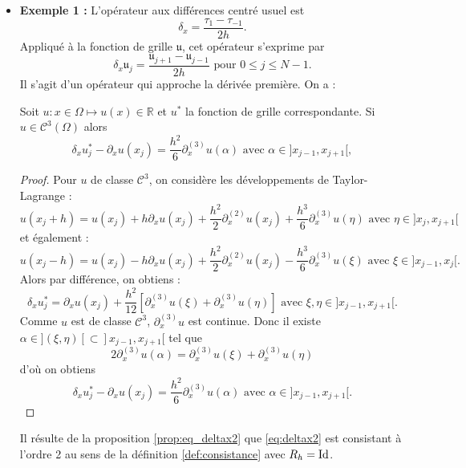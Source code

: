 \begin{itemize}
\item \textbf{Exemple 1 : }L'opérateur aux différences centré usuel est
\begin{equation}
\delta_x = \dfrac{\tau_1 - \tau_{-1}}{2h}.
\label{eq:deltax2}
\end{equation}
Appliqué à la fonction de grille $\mathfrak{u}$, cet opérateur s'exprime par 
\begin{equation}
\delta_x \mathfrak{u}_j = \dfrac{\mathfrak{u}_{j+1} - \mathfrak{u}_{j-1}}{2h} \text{ pour } 0 \leq j \leq N-1.
\end{equation}
Il s'agit d'un opérateur qui approche la dérivée première. On a :
\begin{proposition}
Soit $u: x \in \Omega \mapsto u(x) \in \mathbb{R}$ et $u^*$ la fonction de grille correspondante. Si $u \in \mathcal{C}^3 (\Omega)$ alors 
\begin{equation}
\delta_x u^*_j - \partial_x u(x_j) = \dfrac{h^2}{6} \partial_x^{(3)}u(\alpha) \text{ avec } \alpha \in ]x_{j-1}, x_{j+1}[,
\end{equation}
\label{prop:eq_deltax2}
\end{proposition}

\begin{proof}
Pour $u$ de classe $\mathcal{C}^3$, on considère les développements de Taylor-Lagrange :
\begin{equation}
u(x_j+h) = u(x_j) + h \partial_x u(x_j) + \dfrac{h^2}{2} \partial_x^{(2)} u(x_j) + \dfrac{h^3}{6} \partial_x^{(3)}u (\eta) \text{ avec } \eta \in ]x_j, x_{j+1}[
\end{equation}
et également :
\begin{equation}
u(x_j-h) = u(x_j) - h \partial_x u(x_j) + \dfrac{h^2}{2} \partial_x^{(2)} u(x_j) - \dfrac{h^3}{6} \partial_x^{(3)} u(\xi) \text{ avec } \xi \in ]x_{j-1}, x_{j}[.
\end{equation}
Alors par différence, on obtiens : 
\begin{equation}
\delta_x u^*_j = \partial_x u(x_j) + \dfrac{h^2}{12} \left[ \partial_x^{(3)} u(\xi) + \partial_x^{(3)} u (\eta) \right]  \text{ avec } \xi, \eta \in ]x_{j-1}, x_{j+1}[.
\end{equation}
Comme $u$ est de classe $\mathcal{C}^{3}$, $\partial_x^{(3)}u$ est continue. Donc il existe $\alpha \in ](\xi, \eta)[ \subset ]x_{j-1}, x_{j+1}[$ tel que
\begin{equation}
2 \partial_x^{(3)}u(\alpha) = \partial_x^{(3)} u(\xi) + \partial_x^{(3)} u (\eta)
\end{equation}
d'où on obtiens 
\begin{equation}
\delta_x u^*_j - \partial_x u(x_j) = \dfrac{h^2}{6} \partial_x^{(3)}u(\alpha) \text{ avec } \alpha \in ]x_{j-1}, x_{j+1}[.
\end{equation}
\end{proof}
Il résulte de la proposition \ref{prop:eq_deltax2} que \eqref{eq:deltax2} est consistant à l'ordre 2 au sens de la définition \ref{def:consistance} avec $R_h = \text{Id}$.




\end{itemize}
